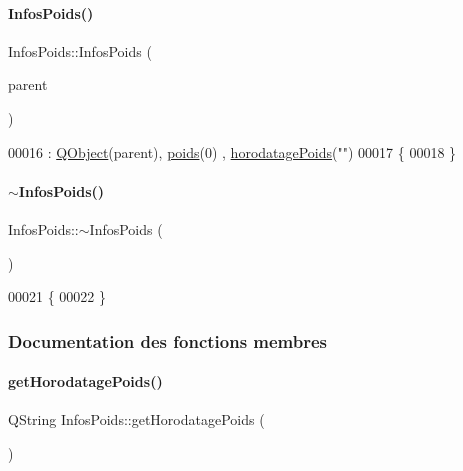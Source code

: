 \paragraph{\texorpdfstring{Infos\+Poids()}{InfosPoids()}}
{\footnotesize\ttfamily Infos\+Poids\+::\+Infos\+Poids (\begin{DoxyParamCaption}\item[{\hyperlink{class_q_object}{Q\+Object} $\ast$}]{parent }\end{DoxyParamCaption})}


\begin{DoxyCode}
00016                                       : \hyperlink{class_q_object}{QObject}(parent), \hyperlink{class_infos_poids_ac5faebb99bd0f87f96b442f10349cbd8}{poids}(0) , 
      \hyperlink{class_infos_poids_a6cff463552adfdde9430073a87878494}{horodatagePoids}(\textcolor{stringliteral}{""})
00017 \{
00018 \}
\end{DoxyCode}
\mbox{\label{class_infos_poids_a14038b5639c79ff6558c91aec12013d1}} 
\paragraph{\texorpdfstring{$\sim$\+Infos\+Poids()}{~InfosPoids()}}
{\footnotesize\ttfamily Infos\+Poids\+::$\sim$\+Infos\+Poids (\begin{DoxyParamCaption}{ }\end{DoxyParamCaption})}


\begin{DoxyCode}
00021 \{
00022 \}
\end{DoxyCode}


\subsubsection{Documentation des fonctions membres}
\mbox{\label{class_infos_poids_a9bd9ffa1a5fcd75a8d75bd7330727620}} 
\paragraph{\texorpdfstring{get\+Horodatage\+Poids()}{getHorodatagePoids()}}
{\footnotesize\ttfamily Q\+String Infos\+Poids\+::get\+Horodatage\+Poids (\begin{DoxyParamCaption}{ }\end{DoxyParamCaption})}



